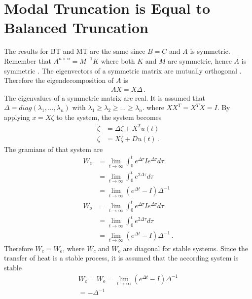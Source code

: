 \section{Modal Truncation is Equal to Balanced Truncation}
The results for BT and MT are the same since \(B = C\) and \(A\) is symmetric.
Remember that \(A^{n\times n} = M^{-1}K\) where both \(K\) and \(M\) are symmetric, hence \(A\) is symmetric \cite{170372}.
The eigenvectors of a symmetric matrix are mutually orthogonal \cite{Zhang}.
Therefore the eigendecomposition of  \(A\) is
\begin{gather}
AX = X\Delta \,.
\end{gather}
The eigenvalues of a symmetric matrix are real.
It is assumed that \(\Delta = diag(\lambda_1, ..., \lambda_n)\) with \(\lambda_1 \geq \lambda_2 \geq ... \geq \lambda_n\).
where \(XX^T = X^TX = I\).
By applying \(x = X\zeta\) to the system, the system becomes
\begin{align}
\dot{\zeta} &= \Delta \zeta + X^{T}u(t) \label{sys-zeta1}\\
\zeta &= X\zeta + Du(t) \,. \label{sys-zeta2}
\end{align}
The gramians of that system are
\begin{align}
W_c &= \lim_{t \to \infty} \int_{0}^{t} e^{\Delta\tau}Ie^{\Delta\tau}d\tau \label{gramc} \\
&= \lim_{t \to \infty} \int_{0}^{t} e^{2\Delta\tau}d\tau \\
&= \lim_{t \to \infty} (e^{\Delta t} - I)\Delta^{-1} \\
W_o &= \lim_{t \to \infty} \int_{0}^{t} e^{\Delta\tau}Ie^{\Delta\tau}d\tau \label{gramo} \\
&= \lim_{t \to \infty} \int_{0}^{t} e^{2\Delta\tau}d\tau \\
&= \lim_{t \to \infty} (e^{\Delta t} - I)\Delta^{-1} \,.
\end{align}
Therefore \(W_c = W_o\), where \(W_c\) and \(W_o\) are diagonal for stable systems.
Since the transfer of heat is a stable process, it is assumed that the according system is stable \cite{658289}
\begin{gather}
W_c = W_o = \lim_{t \to \infty} (e^{\Delta t} - I)\Delta^{-1} \\
= -\Delta^{-1} 
\end{gather}

